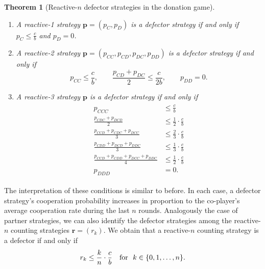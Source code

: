 \documentclass[9pt,twoside,lineno]{pnas-new}
\theoremstyle{plainCl1}
\newtheorem{theorem}{Theorem}
\theoremstyle{plainCl2}
\begin{document}
\begin{theorem}[Reactive-$n$ defector strategies in the donation game] \label{theorem:reactive_defecting_strategies}
~\\[-0.8cm]
\begin{enumerate}
\item A reactive-1 strategy $\mathbf{p}\!=\!(p_C,p_D)$ is a defector strategy if and only if
~$p_{C} \!\le\!  \frac{c}{b}$ and $p_{D} \!=\! 0$.

\item A reactive-2 strategy $\mathbf{p}\!=\!(p_{CC},p_{CD},p_{DC},p_{DD})$ is a defector strategy if and only if
\begin{equation}\label{eq:defecting_conditions_two}
  p_{CC} \le \frac{c}{b}, \qquad \displaystyle \frac{p_{CD} \!+\! p_{DC}}{2} \le \frac{c}{2b}, \qquad p_{DD} = 0.
\end{equation}
\item A reactive-3 strategy $\mathbf{p}$ is a defector strategy if and only if
\begin{align}\label{eq:defecting_conditions_three}
  \begin{split}
  p_{CCC} & \le \frac{c}{b} \\
  \frac{p_{CDC} + p_{DCD}}{2} & \leq \frac{1}{2} \cdot \frac{c}{b} \\
  \frac{p_{CCD} + p_{CDC} + p_{DCC}}{3} & \leq \frac{2}{3} \cdot \frac{c}{b} \\
  \frac{p_{CDD} + p_{DCD} + p_{DDC}}{3} & \leq \frac{1}{3} \cdot \frac{c}{b} \\
  \frac{p_{CCD} + p_{CDD} + p_{DCC} + p_{DDC}}{4}  & \leq \frac{1}{2} \cdot \frac{c}{b}  \\
  p_{DDD} & = 0.
  \end{split}
\end{align}
\end{enumerate}
\end{theorem}

\noindent
The interpretation of these conditions is similar to before. 
In each case, a defector strategy's cooperation probability increases in proportion to the co-player's average cooperation rate during the last $n$ rounds. 
Analogously the case of partner strategies, we can also identify the defector strategies among the reactive-$n$ counting strategies $\mathbf{r}=(r_k)$. 
We obtain that a reactive-$n$ counting strategy is a defector if and only if 
\begin{equation} \label{Eq:DefectorCounting}
r_{k} \le  \frac{k}{n} \cdot \frac{c}{b} ~~~\text{\normalfont for }~ k \in \{0, 1, \dots, n\}.
\end{equation}
\end{document}
